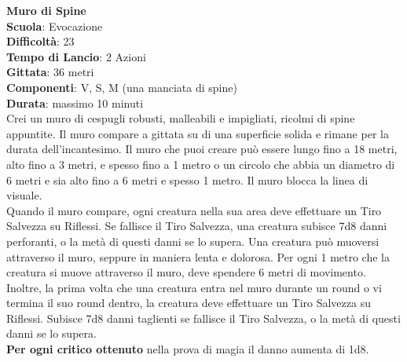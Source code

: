 \begin{multicols}{2}
\medskip\textbf{Muro di Spine}\\
\textbf{Scuola}: Evocazione\\
\textbf{Difficoltà}: 23\\
\textbf{Tempo di Lancio}: 2 Azioni\\
\textbf{Gittata}: 36 metri\\
\textbf{Componenti}: V, S, M (una manciata di spine)\\
\textbf{Durata}: massimo 10 minuti\\
Crei un muro di cespugli robusti, malleabili e impigliati, ricolmi di spine appuntite. Il muro compare a gittata su di una superficie solida e rimane per la durata dell'incantesimo. Il muro che puoi creare può essere lungo fino a 18 metri, alto fino a 3 metri, e spesso fino a 1 metro o un circolo che abbia un diametro di 6 metri e sia alto fino a 6 metri e spesso 1 metro. Il muro blocca la linea di visuale.\\
Quando il muro compare, ogni creatura nella sua area deve effettuare un Tiro Salvezza su Riflessi. Se fallisce il Tiro Salvezza, una creatura subisce 7d8 danni perforanti, o la metà di questi danni se lo supera. Una creatura può muoversi attraverso il muro, seppure in maniera lenta e dolorosa. Per ogni 1 metro che la creatura si muove attraverso il muro, deve spendere 6 metri di movimento. Inoltre, la prima volta che una creatura entra nel muro durante un round o vi termina il suo round dentro, la creatura deve effettuare un Tiro Salvezza su Riflessi. Subisce 7d8 danni taglienti se fallisce il Tiro Salvezza, o la metà di questi danni se lo supera.\\
\textbf{Per ogni critico ottenuto} nella prova di magia il danno aumenta di 1d8.


\end{multicols}
